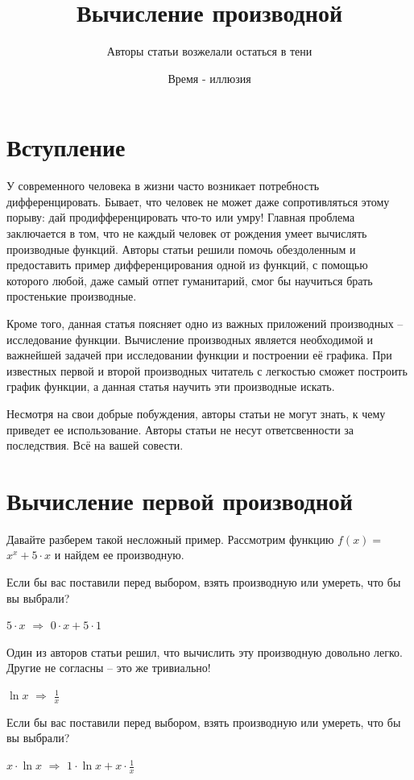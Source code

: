\documentclass{article}
\title{Вычисление производной}
\author{Авторы статьи возжелали остаться в тени}
\date{Время - иллюзия}
\begin{document}
\maketitle

\section{Вступление}

У современного человека в жизни часто возникает потребность дифференцировать. Бывает, что человек не может даже сопротивляться этому порыву: дай продифференцировать что-то или умру! Главная проблема заключается в том, что не каждый человек от рождения умеет вычислять производные функций. Авторы статьи решили помочь обездоленным и предоставить пример дифференцирования одной из функций, с помощью которого любой, даже самый отпет гуманитарий, смог бы научиться брать простенькие производные.

Кроме того, данная статья поясняет одно из важных приложений производных -- исследование функции. Вычисление производных является необходимой и важнейшей задачей при исследовании функции и построении её графика. При известных первой и второй производных читатель с легкостью сможет построить график функции, а данная статья научить эти производные искать.

Несмотря на свои добрые побуждения, авторы статьи не могут знать, к чему приведет ее использование. Авторы статьи не несут ответсвенности за последствия. Всё на вашей совести.

\section{Вычисление первой производной}

Давайте разберем такой несложный пример. Рассмотрим функцию $f(x) = $ $x ^ {x} + 5 \cdot x$ и найдем ее производную.

Если бы вас поставили перед выбором, взять производную или умереть, что бы вы выбрали?

$5 \cdot x$ $\Rightarrow$ $0 \cdot x + 5 \cdot 1$

Один из авторов статьи решил, что вычислить эту производную довольно легко. Другие не согласны -- это же тривиально!

$ \ln x$ $\Rightarrow$ $\frac{1}{x}$

Если бы вас поставили перед выбором, взять производную или умереть, что бы вы выбрали?

$x \cdot  \ln x$ $\Rightarrow$ $1 \cdot  \ln x + x \cdot \frac{1}{x}$
\end{document}
